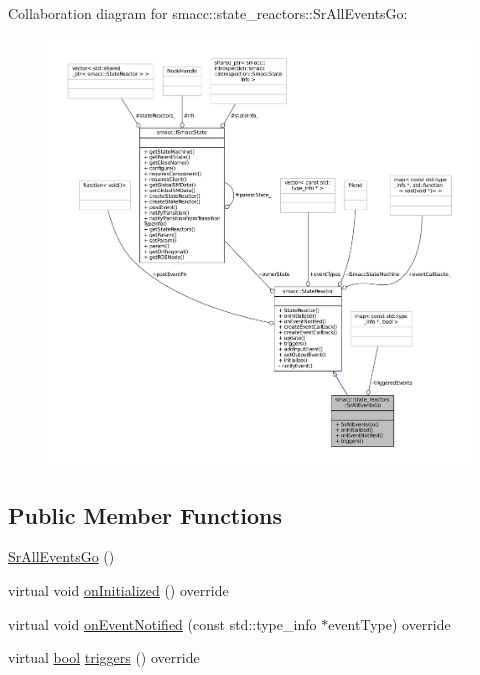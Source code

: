 Collaboration diagram for smacc\+:\+:state\+\_\+reactors\+:\+:Sr\+All\+Events\+Go\+:
\nopagebreak
\begin{figure}[H]
\begin{center}
\leavevmode
\includegraphics[width=350pt]{classsmacc_1_1state__reactors_1_1SrAllEventsGo__coll__graph}
\end{center}
\end{figure}
\subsection*{Public Member Functions}
\begin{DoxyCompactItemize}
\item 
\hyperlink{classsmacc_1_1state__reactors_1_1SrAllEventsGo_a22492ff31d435e29b972a04855cde3bd}{Sr\+All\+Events\+Go} ()
\item 
virtual void \hyperlink{classsmacc_1_1state__reactors_1_1SrAllEventsGo_adda075f2b3ec56115d02e9fb1a1c26fe}{on\+Initialized} () override
\item 
virtual void \hyperlink{classsmacc_1_1state__reactors_1_1SrAllEventsGo_abd72dc79374c34111d24691c459850c2}{on\+Event\+Notified} (const std\+::type\+\_\+info $\ast$event\+Type) override
\item 
virtual \hyperlink{classbool}{bool} \hyperlink{classsmacc_1_1state__reactors_1_1SrAllEventsGo_ab752043eda070661d2a676b580c679b7}{triggers} () override
\end{DoxyCompactItemize}
